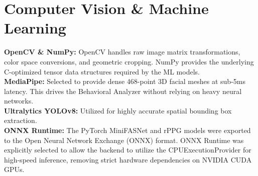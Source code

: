 \documentclass[12pt, a4paper]{report}
\begin{document}
\section{Computer Vision \& Machine Learning}
\textbf{OpenCV \& NumPy:} OpenCV handles raw image matrix transformations, color space conversions, and geometric cropping. NumPy provides the underlying C-optimized tensor data structures required by the ML models.
\\
\textbf{MediaPipe:} Selected to provide dense 468-point 3D facial meshes at sub-5ms latency. This drives the Behavioral Analyzer without relying on heavy neural networks.
\\
\textbf{Ultralytics YOLOv8:} Utilized for highly accurate spatial bounding box extraction. 
\\
\textbf{ONNX Runtime:} The PyTorch MiniFASNet and rPPG models were exported to the Open Neural Network Exchange (ONNX) format. ONNX Runtime was explicitly selected to allow the backend to utilize the CPUExecutionProvider for high-speed inference, removing strict hardware dependencies on NVIDIA CUDA GPUs.
\end{document}
